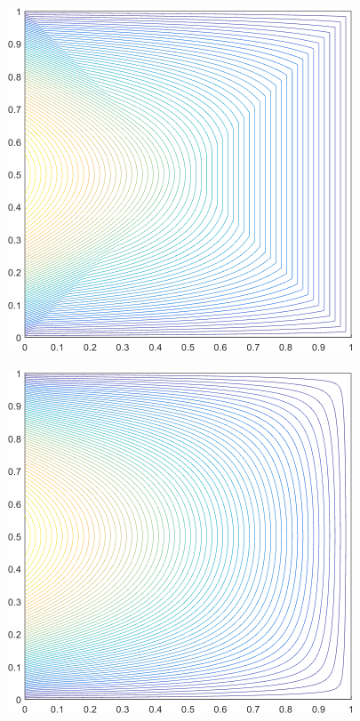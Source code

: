 \begin{figure}
\begin{subfigure}[b]{0.39\textwidth}
		\includegraphics[width=\textwidth]{figures/sec_BF/square_PWLD2_contour_b8.png}
		\caption{}
	\end{subfigure}
	\vfill
	\begin{subfigure}[b]{0.39\textwidth}
		\centering
		\includegraphics[width=\textwidth]{figures/sec_BF/square_MV2_contour_b8.png}

\end{subfigure}
\end{figure}
